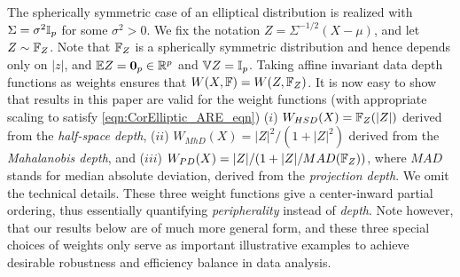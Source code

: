 The spherically symmetric case of an elliptical distribution is realized with $\Sigma = \sigma^{2} {\mathbb{I}}_{p}$ for some $\sigma^{2} > 0$. We fix the notation $Z = \Sigma^{-1/2} (X - \mu)$, and let 
$Z \sim {\mathbb{F}}_{Z}$. Note that ${\mathbb{F}}_{Z}$ is a spherically symmetric distribution and hence
depends only on $|z|$, and ${\mathbb{E}} Z = \mathbf{0}_{p} \in {\mathbb{R}}^{p}$ and ${\mathbb{V}} Z = {\mathbb{I}}_{p}$. Taking affine invariant data depth functions as weights ensures that $W(X, {\mathbb{F}}) = W(Z, {\mathbb{F}}_Z)$. It is now easy to show that results in this paper are valid for the weight functions (with appropriate scaling to satisfy \eqref{eqn:CorElliptic_ARE_eqn})
($i$) $W_{HSD} (X) = {\mathbb{F}}_{Z} (| Z |)$ derived from the \textit{half-space depth},  
($ii$) $W_{MhD} (X) = |Z|^{2}/(1 + | Z |^2)$ derived from the \textit{Mahalanobis depth}, 
and ($iii$) $W_{PD} (X) = |Z|/(1+ | Z |/MAD({\mathbb{F}}_{Z}))$, where $MAD$ stands for median 
absolute deviation, derived from the \textit{projection depth}. We omit the technical 
details. These three weight functions give a center-inward partial ordering, thus essentially 
quantifying \textit{peripherality} instead of \textit{depth}.
Note however, that our results below are of much more general form, and 
these three special choices of weights only serve as important illustrative examples 
to achieve desirable robustness and efficiency balance in data analysis.


